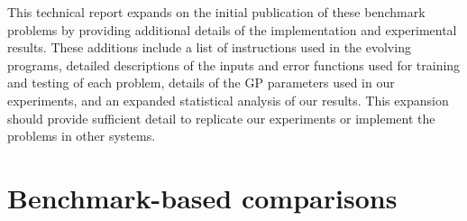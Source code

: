 \documentclass{sig-alternate}
\begin{document}
This technical report expands on the initial publication of these benchmark problems \cite{Helmuth:2015:GECCO} by providing additional details of the implementation and experimental results. These additions include a list of instructions used in the evolving programs, detailed descriptions of the inputs and error functions used for training and testing of each problem, details of the GP parameters used in our experiments, and an expanded statistical analysis of our results. This expansion should provide sufficient detail to replicate our experiments or implement the problems in other systems.







\section{Benchmark-based comparisons}
\end{document}

